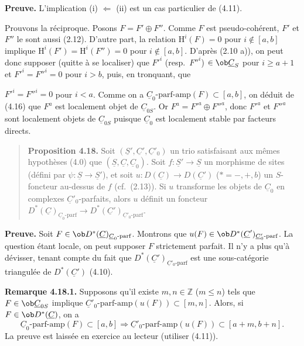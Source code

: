 \textbf{Preuve.} L'implication (i) $\Leftarrow$ (ii) est un cas particulier de (4.11).

Prouvons la réciproque. Posons $F = F' \oplus F''$. Comme $F$ est pseudo-cohérent, $F'$ et $F''$ le sont aussi (2.12). D'autre part, la relation $\mathrm{H}^i(F) = 0$ pour $i \notin [a, b]$ implique $\mathrm{H}^i(F') = \mathrm{H}^i(F'') = 0$ pour $i \notin [a, b]$. D'après (2.10 a)), on peut donc supposer (quitte à se localiser) que $F'^i$ (resp.\ $F''^i$) $\in \ob \underline{C}_S$ pour $i \geqslant a+1$ et $F'^i = F''^i = 0$ pour $i > b$, puis, en tronquant, que

$F'^i = F''^i = 0$ pour $i < a$. Comme on a $\underline{C}_0\text{-parf-amp}(F) \subset [a, b]$, on déduit de (4.16) que $F^a$ est localement objet de $\underline{C}_{0S}$. Or $F^a = F'^a \oplus F''^a$, donc $F'^a$ et $F''^a$ sont localement objets de $\underline{C}_{0S}$ puisque $\underline{C}_0$ est localement stable par facteurs directs.

\begin{quote}
\textbf{Proposition 4.18.} Soit $(\underline{S}', \underline{C}', \underline{C}'_0)$ un trio satisfaisant aux mêmes hypothèses (4.0) que $(\underline{S}, \underline{C}, \underline{C}_0)$. Soit $f : \underline{S}' \to \underline{S}$ un morphisme de sites (défini par $\psi : \underline{S} \to \underline{S}'$), et soit $u : D(\underline{C}) \to D(\underline{C}')$ ($* = -, +, b$) un $S$-foncteur au-dessus de $f$ (cf.\ (2.13)). Si $u$ transforme les objets de $\underline{C}_0$ en complexes $\underline{C}'_0$-parfaits, alors $u$ définit un foncteur $D^*(\underline{C})_{\underline{C}_0\text{-parf}} \to D^*(\underline{C}')_{\underline{C}'_0\text{-parf}}$.
\end{quote}

\textbf{Preuve.} Soit $F \in \ob D^*(\underline{C})_{\underline{C}_0\text{-parf}}$. Montrons que $u(F) \in \ob D^*(\underline{C}')_{\underline{C}'_0\text{-parf}}$. La question étant locale, on peut supposer $F$ strictement parfait. Il n'y a plus qu'à dévisser, tenant compte du fait que $D^*(\underline{C}')_{\underline{C}'_0\text{-parf}}$ est une sous-catégorie triangulée de $D^*(\underline{C}')$ (4.10).

\textbf{Remarque 4.18.1.} Supposons qu'il existe $m, n \in \mathbb{Z}$ ($m \leqslant n$) tels que $F \in \ob \underline{C}_{0S}$ implique $\underline{C}'_0\text{-parf-amp}(u(F)) \subset [m, n]$. Alors, si $F \in \ob D^*(\underline{C})$, on a
\[
\underline{C}_0\text{-parf-amp}(F) \subset [a, b] \Rightarrow \underline{C}'_0\text{-parf-amp}(u(F)) \subset [a+m, b+n].
\]
La preuve est laissée en exercice au lecteur (utiliser (4.11)).

